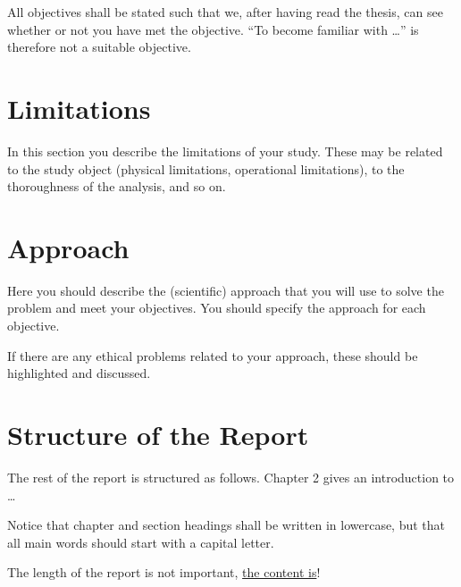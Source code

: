 All objectives shall be stated such that we, after having read the thesis, can see whether or not you have met the objective. ``To become familiar with \ldots'' is therefore not a suitable objective.

\section{Limitations}
In this section you describe the limitations of your study. These may be related to the study object (physical limitations, operational limitations), to the thoroughness of the analysis, and so on.
\section{Approach}
Here you should describe the (scientific) approach that you will use to solve the problem and meet your objectives. You should specify the approach for each objective.

If there are any ethical problems related to your approach, these should be highlighted and discussed.
\section{Structure of the Report}
The rest of the report is structured as follows. Chapter 2 gives an introduction to \ldots

\begin{remark}
Notice that chapter and section headings shall be written in lowercase, but that all main words should start with a capital letter.
\end{remark}
\vspace{2pc}

The length of the report is not important, \underline{the content is}! 
